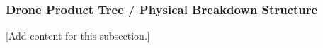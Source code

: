 
\subsubsection{Drone Product Tree / Physical Breakdown Structure}
\label{subsubsec:design_1_1_2_drone_product_tree}

[Add content for this subsection.]
